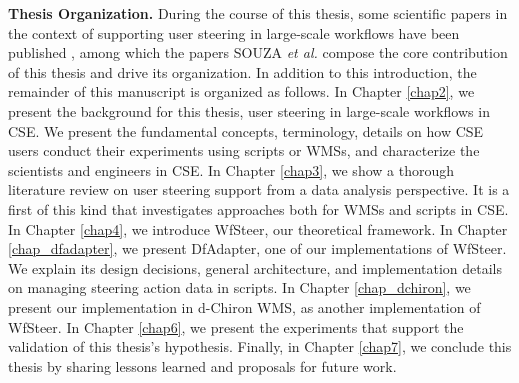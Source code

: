 \noindent \textbf{Thesis Organization.}
During the course of this thesis, some scientific papers in the context of supporting user steering in large-scale workflows have been published \cite{
souza_keeping_2019,
Souza2017Data,
silva_adding_2018,
Souza2018Provenance,
souza_efficient_2019,
Souza2016Online,
Souza2017Tracking,
souza_towards_2018,
Souza2017Spark,
Souza2015Parallel,
Silva2018Capturing,
Silva2016Integrating}, among which the papers SOUZA \textit{et al.} \cite{Souza2017Data,Souza2018Provenance,souza_keeping_2019} compose the core contribution of this thesis and drive its organization.
In addition to this introduction, the remainder of this manuscript is organized as follows.
In Chapter \ref{chap2}, we present the background for this thesis,
\ie{} user steering in large-scale workflows in CSE. We present the fundamental concepts,
terminology, details on how CSE users conduct their experiments using scripts or WMSs,
and characterize the scientists and engineers in CSE.
In Chapter \ref{chap3}, we show a thorough literature review on
user steering support from a data analysis perspective.
It is a first of this kind that investigates approaches both for WMSs and scripts in CSE.
In Chapter \ref{chap4}, we introduce WfSteer, our theoretical framework.
In Chapter \ref{chap_dfadapter}, we present DfAdapter, one of our implementations of WfSteer. We explain its design decisions, general architecture, and implementation details on managing steering action data in scripts.
In Chapter \ref{chap_dchiron}, we present our implementation in d-Chiron WMS, as another implementation of WfSteer.
In Chapter \ref{chap6}, we present the experiments that support the validation of this thesis's hypothesis.
Finally, in Chapter \ref{chap7}, we conclude this thesis by sharing lessons learned and proposals for future work.


  